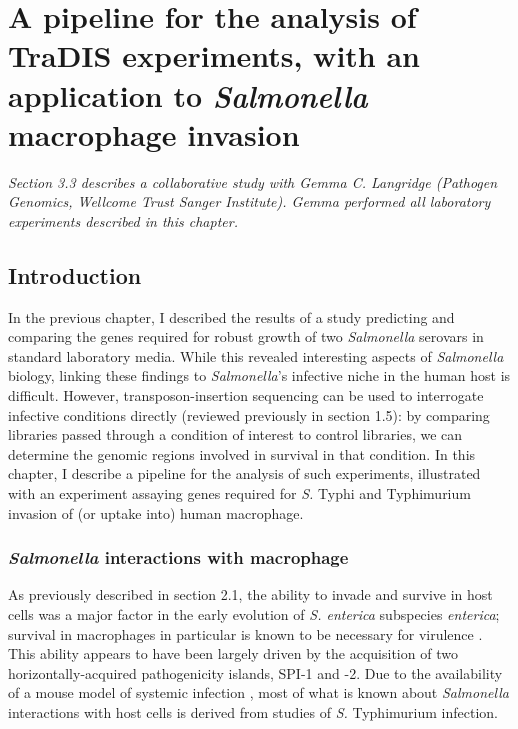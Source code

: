 
\chapter{A pipeline for the analysis of TraDIS experiments, with an application to {\it Salmonella} macrophage invasion}
\label{sec:chapterPingpong}
\ifpdf
    \graphicspath{{Chapter3/Chapter3Figs/EPS/}{Chapter3/Chapter3Figs/}}
\fi

\textit{Section 3.3 describes a collaborative study with Gemma C. Langridge (Pathogen Genomics, Wellcome Trust Sanger Institute). Gemma performed all laboratory experiments described in this chapter.}

\section{Introduction}

In the previous chapter, I described the results of a study predicting and comparing the genes required for robust growth of two \textit{Salmonella} serovars in standard laboratory media. While this revealed interesting aspects of \textit{Salmonella} biology, linking these findings to \textit{Salmonella}'s infective niche in the human host is difficult. However, transposon-insertion sequencing can be used to interrogate infective conditions directly (reviewed previously in section 1.5): by comparing libraries passed through a condition of interest to control libraries, we can determine the genomic regions involved in survival in that condition. In this chapter, I describe a pipeline for the analysis of such experiments, illustrated with an experiment assaying genes required for \textit{S.} Typhi and Typhimurium invasion of (or uptake into) human macrophage.

\subsection{\textit{Salmonella} interactions with macrophage}

As previously described in section 2.1, the ability to invade and survive in host cells was a major factor in the early evolution of \textit{S. enterica} subspecies \textit{enterica}; survival in macrophages in particular is known to be necessary for virulence \parencite{Fields1986}. This ability appears to have been largely driven by the acquisition of two horizontally-acquired pathogenicity islands, SPI-1 and -2. Due to the availability of a mouse model of systemic infection \parencite{Santos2001}, most of what is known about \textit{Salmonella} interactions with host cells is derived from studies of \textit{S.} Typhimurium infection.

